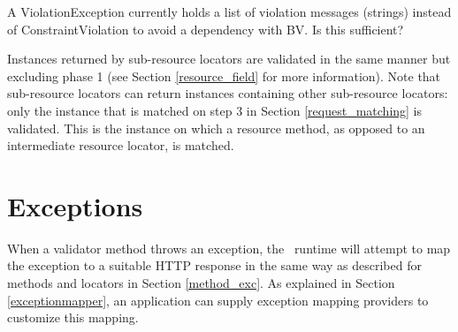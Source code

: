 \begin{ednote}
A ViolationException currently holds a list of violation messages (strings) instead of ConstraintViolation to avoid a dependency with BV. Is this sufficient?
\end{ednote}

Instances returned by sub-resource locators are validated in the same manner but excluding phase 1 (see Section \ref{resource_field} for more information). Note that sub-resource locators can return instances containing other sub-resource locators: only the instance that is matched on step 3 in Section \ref{request_matching} is validated. This is the instance on which a resource method, as opposed to an intermediate resource locator, is matched.

\section{Exceptions}
\label{exceptions_validators}

When a validator method throws an exception, the \jaxrs\ runtime will attempt to map the exception to a suitable HTTP response in the same way as described for methods and locators in Section \ref{method_exc}.  As explained in Section \ref{exceptionmapper}, an application can supply exception mapping providers to customize this mapping.




